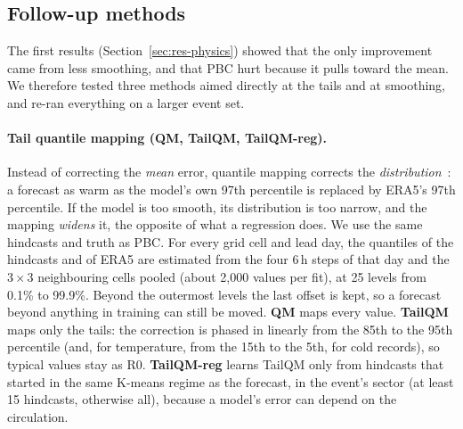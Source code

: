 \documentclass{article}
\newcommand{\R}[1]{\textsf{R#1}}
\begin{document}
\subsection{Follow-up methods}
\label{sec:follow-method}
The first results (Section~\ref{sec:res-physics}) showed that the only improvement came from less smoothing, and that PBC hurt because it pulls toward the mean.
We therefore tested three methods aimed directly at the tails and at smoothing, and re-ran everything on a larger event set.

\paragraph{Tail quantile mapping (QM, TailQM, TailQM-reg).}
Instead of correcting the \emph{mean} error, quantile mapping corrects the \emph{distribution}~\cite{cannon2015qm}: a forecast as warm as the model's own
97th percentile is replaced by ERA5's 97th percentile. If the model is too smooth, its distribution is too narrow, and the mapping \emph{widens} it, the
opposite of what a regression does. We use the same hindcasts and truth as PBC. For every grid cell and lead day, the quantiles of the hindcasts and of ERA5 are
estimated from the four 6\,h steps of that day and the $3\times3$ neighbouring cells pooled (about 2{,}000 values per fit), at 25 levels from 0.1\% to 99.9\%.
Beyond the outermost levels the last offset is kept, so a forecast beyond anything in training can still be moved.
\textbf{QM} maps every value. \textbf{TailQM} maps only the tails: the correction is phased in linearly from the 85th to the 95th percentile (and, for temperature, from
the 15th to the 5th, for cold records), so typical values stay as \R{0}. \textbf{TailQM-reg} learns TailQM only from hindcasts that started in the same K-means
regime as the forecast, in the event's sector (at least 15 hindcasts, otherwise all), because a model's error can depend on the circulation.
\end{document}
